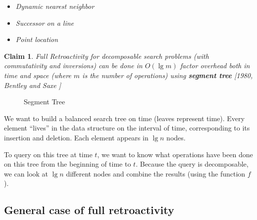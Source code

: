 \documentclass[11pt]{article}
\newtheorem{claim}[theorem]{Claim}
\begin{document}
\begin{itemize}
\item {\em Dynamic nearest neighbor}
\item {\em Successor on a line}
\item {\em Point location}
\end{itemize}

\begin{claim}
Full Retroactivity for decomposable search problems (with commutativity and inversions) can be done in $O(\lg{m})$ factor overhead both in time and space (where $m$ is the number of operations) using {\bf segment tree} [1980, Bentley and Saxe \cite{bs}]
\end{claim}

\begin{figure}[ht]
  \centering
  \leavevmode
  \caption{Segment Tree}
\end{figure}

We want to build a balanced search tree on time (leaves represent time). Every element ``lives'' in the data structure on the interval of time, corresponding to its insertion and deletion. Each element appears in $\lg{n}$ nodes.

To query on this tree at time $t$, we want to know what operations have been done on this tree from the beginning of time to $t$. Because the query is decomposable, we can look at $\lg{n}$ different nodes and combine the results (using the function $f$). 

\subsection{General case of full retroactivity}
\end{document}
